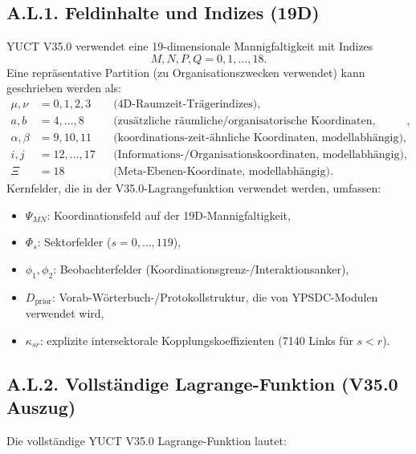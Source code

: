 \documentclass[13pt,a4paper]{article}
\newcommand{\Dprior}{D_{\mathrm{prior}}}
\begin{document}
	\subsection*{A.L.1. Feldinhalte und Indizes (19D)}
	YUCT V35.0 verwendet eine 19-dimensionale Mannigfaltigkeit mit Indizes
	\[ M,N,P,Q=0,1,\dots,18. \]
	Eine repräsentative Partition (zu Organisationszwecken verwendet) kann geschrieben werden als:
	\begin{align*}
		\mu,\nu &= 0,1,2,3 &&\text{(4D-Raumzeit-Trägerindizes)},\\
		a,b &= 4,\dots,8 &&\text{(zusätzliche räumliche/organisatorische Koordinaten, modellabhängig)},\\
		\alpha,\beta &= 9,10,11 &&\text{(koordinations-zeit-ähnliche Koordinaten, modellabhängig)},\\
		i,j &= 12,\dots,17 &&\text{(Informations-/Organisationskoordinaten, modellabhängig)},\\
		\Xi &= 18 &&\text{(Meta-Ebenen-Koordinate, modellabhängig)}.
	\end{align*}
	Kernfelder, die in der V35.0-Lagrangefunktion verwendet werden, umfassen:
	\begin{itemize}[leftmargin=*]
		\item $\Psi_{MN}$: Koordinationsfeld auf der 19D-Mannigfaltigkeit,
		\item $\Phi_s$: Sektorfelder ($s=0,\dots,119$),
		\item $\phi_1,\phi_2$: Beobachterfelder (Koordinationsgrenz-/Interaktionsanker),
		\item $\Dprior$: Vorab-Wörterbuch-/Protokollstruktur, die von YPSDC-Modulen verwendet wird,
		\item $\kappa_{sr}$: explizite intersektorale Kopplungskoeffizienten (7140 Links für $s<r$).
	\end{itemize}
	
	\subsection*{A.L.2. Vollständige Lagrange-Funktion (V35.0 Auszug)}
	Die vollständige YUCT V35.0 Lagrange-Funktion lautet:
	
\end{document}
